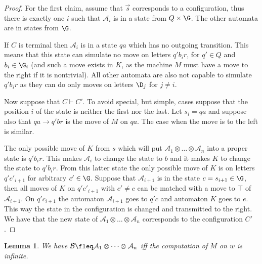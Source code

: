\documentclass{LMCS}
\theoremstyle{plain}\newtheorem{remark}{Remark}
\theoremstyle{plain}\newtheorem{lemma}[thm]{Lemma}
\renewcommand{\Aa}{\mathcal{A}}
\renewcommand{\Bb}{\mathcal{B}}
\newcommand{\vecs}{\vec s}
\newcommand{\vAa}{\Aa_1\otimes\dots\otimes\Aa_n}
\begin{document}
\begin{proof}

  For the first claim, assume that $\vecs$ corresponds to a configuration, 
thus there is exactly one $i$
  such that $\Aa_i$ is in a state from $Q\times\G$. The other
  automata are in states from $\G$. 
  
  If $C$ is terminal then $\Aa_i$ is in a state $qa$ which has
  no  outgoing transition. This means that this state can
  simulate no  move on letters $q'b_ir$, for  $q'\in Q$ and $b_i \in \G_i$ (and
  such a move exists in $K$, as the machine $M$ must have a move to the
  right if it is nontrivial). All other automata are also not capable
  to simulate $q'b_ir$ as they can do only moves on letters $\D_j$ for
  $j\not=i$.

  Now suppose that $C\vdash C'$. To avoid special, but simple, cases
  suppose that the position $i$ of the state is neither the first nor
  the last. Let $s_i=qa$ and suppose also that $qa\to q'br$ is the
  move of $M$ on $qa$. The case when the move is to the left is
  similar.

  The only possible move of $K$ from $s$ which will put $\vAa$
  into a proper state is $q'b_ir$. This makes $\Aa_i$ to change the
  state to $b$ and it makes $K$ to change the state to $q'b_ir$. From
  this latter state the only possible move of $K$ is on letters
  $q'c'_{i+1}$ for arbitrary $c'\in \G$. Suppose that $\Aa_{i+1}$ is in the
  state $c=s_{i+1} \in \G$, then all moves of $K$ on $q'c'_{i+1}$ with $c'\not=c$
  can be matched with a move to $\top$ of $\Aa_{i+1}$. On $q'c_{i+1}$
 the automaton $\Aa_{i+1}$ goes to $q'c$ and automaton $K$ goes to
  $e$. This way the state in the configuration is changed and
  transmitted to the right. We have that the new state of $\vAa$
  corresponds to the configuration $C'$. 


\end{proof}

\begin{lemma}
  We have $\Bb \fleq \vAa$ iff the computation of $M$ on $w$ is
  infinite. 
\end{lemma}
\end{document}
